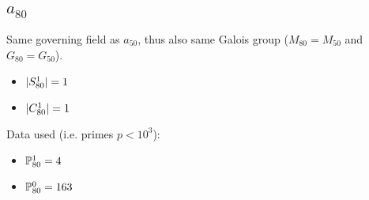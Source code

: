 \subsection{{\huge $a_{80}$}}
Same governing field as $a_{50}$, thus also same Galois group ($M_{80} = M_{50}$ and $G_{80} = G_{50}$).
\begin{itemize}
	\item $| S_{80}^1 | = 1$
	\item $| C_{80}^1 | = 1$
\end{itemize}
Data used (i.e. primes $p<10^3$):
\begin{itemize}
	\item $\mathbb{P}_{80}^1 = 4$
	\item $\mathbb{P}_{80}^0 = 163$
\end{itemize}


